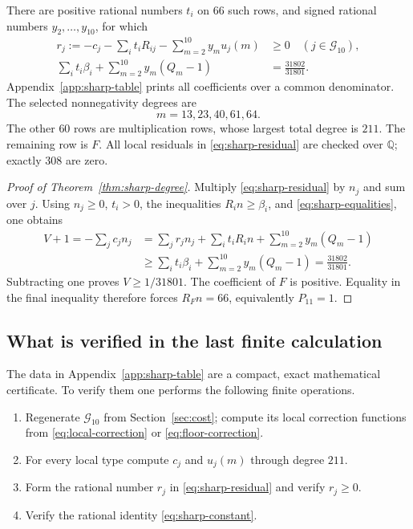 \documentclass[12pt,a4paper]{article}
\numberwithin{equation}{section}
\theoremstyle{definition}
\newcommand{\Q}{\mathbb Q}
\newcommand{\ccat}{\mathscr G}
\begin{document}
There are positive rational numbers \(t_i\) on \(66\) such rows,
and signed rational numbers \(y_2,\ldots,y_{10}\), for which
\begin{align}
 r_j:=-c_j-\sum_i t_iR_{ij}
                  -\sum_{m=2}^{10}y_mu_j(m)&\geq0
                                \quad(j\in\ccat_{10}),\label{eq:sharp-residual}\\
 \sum_i t_i\beta_i+\sum_{m=2}^{10}y_m(Q_m-1)&=
                                   \frac{31802}{31801}.\label{eq:sharp-constant}
\end{align}
Appendix~\ref{app:sharp-table} prints all coefficients over a common
denominator. The selected nonnegativity degrees are
\[
                            m=13,23,40,61,64.
\]
The other \(60\) rows are multiplication rows, whose largest total
degree is \(211\). The remaining row is \(F\).
All local residuals in \eqref{eq:sharp-residual} are checked over
\(\Q\); exactly \(308\) are zero.

\begin{proof}[Proof of Theorem~\ref{thm:sharp-degree}]
Multiply \eqref{eq:sharp-residual} by \(n_j\) and sum over \(j\).
Using \(n_j\geq0\), \(t_i>0\), the inequalities \(R_in\geq\beta_i\),
and \eqref{eq:sharp-equalities}, one obtains
\[
 \begin{split}
 V+1=-\sum_jc_jn_j
 &=\sum_j r_jn_j+\sum_i t_iR_in
                         +\sum_{m=2}^{10}y_m(Q_m-1)\\
 &\geq\sum_i t_i\beta_i+\sum_{m=2}^{10}y_m(Q_m-1)
   =\frac{31802}{31801}.
 \end{split}
\]
Subtracting one proves \(V\geq1/31801\).
The coefficient of \(F\) is positive.
Equality in the final inequality therefore forces
\(R_Fn=66\), equivalently \(P_{11}=1\).
\end{proof}

\subsection{What is verified in the last finite calculation}

The data in Appendix~\ref{app:sharp-table} are a compact, exact
mathematical certificate. To verify them one performs the following
finite operations.

\begin{enumerate}
\item Regenerate \(\ccat_{10}\) from
Section~\ref{sec:cost}; compute its local correction functions from
\eqref{eq:local-correction} or \eqref{eq:floor-correction}.
\item For every local type compute \(c_j\) and \(u_j(m)\) through
degree \(211\).
\item Form the rational number \(r_j\) in
\eqref{eq:sharp-residual} and verify \(r_j\geq0\).
\item Verify the rational identity \eqref{eq:sharp-constant}.
\end{enumerate}
\end{document}
